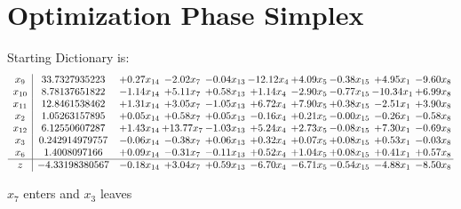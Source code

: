 \documentclass[9pt]{article}
\begin{document}
\section{Optimization Phase Simplex}
Starting Dictionary is:
\[\begin{array}{c| c c@{\hskip 2pt} c@{\hskip 2pt} c@{\hskip 2pt} c@{\hskip 2pt} c@{\hskip 2pt} c@{\hskip 2pt} c@{\hskip 2pt} c@{\hskip 2pt} }
 x_{9}   &  33.7327935223 & +  0.27 x_{14} & -2.02 x_{7} & -0.04 x_{13} & -12.12 x_{4} & +  4.09 x_{5} & -0.38 x_{15} & +  4.95 x_{1} & -9.60 x_{8}\\
 x_{10}   &  8.78137651822 & -1.14 x_{14} & +  5.11 x_{7} & +  0.58 x_{13} & +  1.14 x_{4} & -2.90 x_{5} & -0.77 x_{15} & -10.34 x_{1} & +  6.99 x_{8}\\
 x_{11}   &  12.8461538462 & +  1.31 x_{14} & +  3.05 x_{7} & -1.05 x_{13} & +  6.72 x_{4} & +  7.90 x_{5} & +  0.38 x_{15} & -2.51 x_{1} & +  3.90 x_{8}\\
 x_{2}   &  1.05263157895 & +  0.05 x_{14} & +  0.58 x_{7} & +  0.05 x_{13} & -0.16 x_{4} & +  0.21 x_{5} & -0.00 x_{15} & -0.26 x_{1} & -0.58 x_{8}\\
 x_{12}   &  6.12550607287 & +  1.43 x_{14} & + 13.77 x_{7} & -1.03 x_{13} & +  5.24 x_{4} & +  2.73 x_{5} & -0.08 x_{15} & +  7.30 x_{1} & -0.69 x_{8}\\
 x_{3}   &  0.242914979757 & -0.06 x_{14} & -0.38 x_{7} & +  0.06 x_{13} & +  0.32 x_{4} & +  0.07 x_{5} & +  0.08 x_{15} & +  0.53 x_{1} & -0.03 x_{8}\\
 x_{6}   &  1.4008097166 & +  0.09 x_{14} & -0.31 x_{7} & -0.11 x_{13} & +  0.52 x_{4} & +  1.04 x_{5} & +  0.08 x_{15} & +  0.41 x_{1} & +  0.57 x_{8}\\
\hline
z    &  -4.33198380567 & -0.18 x_{14} & +  3.04 x_{7} & +  0.59 x_{13} & -6.70 x_{4} & -6.71 x_{5} & -0.54 x_{15} & -4.88 x_{1} & -8.50 x_{8}\\
\end{array}\]


 $ x_{7} $ enters and $ x_{3} $ leaves 
\end{document}
